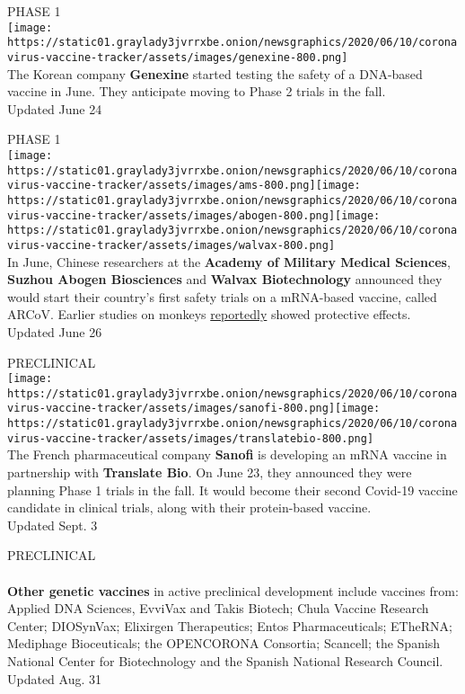 PHASE 1\\
\texttt{[image: https://static01.graylady3jvrrxbe.onion/newsgraphics/2020/06/10/coronavirus-vaccine-tracker/assets/images/genexine-800.png]}\\
The Korean company \textbf{Genexine} started testing the safety of a
DNA-based vaccine in June. They anticipate moving to Phase 2 trials in
the fall.\\
Updated June 24

PHASE 1\\
\texttt{[image: https://static01.graylady3jvrrxbe.onion/newsgraphics/2020/06/10/coronavirus-vaccine-tracker/assets/images/ams-800.png]}\texttt{[image: https://static01.graylady3jvrrxbe.onion/newsgraphics/2020/06/10/coronavirus-vaccine-tracker/assets/images/abogen-800.png]}\texttt{[image: https://static01.graylady3jvrrxbe.onion/newsgraphics/2020/06/10/coronavirus-vaccine-tracker/assets/images/walvax-800.png]}\\
In June, Chinese researchers at the \textbf{Academy of Military Medical
Sciences}, \textbf{Suzhou Abogen Biosciences} and \textbf{Walvax
Biotechnology} announced they would start their country's first safety
trials on a mRNA-based vaccine, called ARCoV. Earlier studies on monkeys
\href{https://news.cgtn.com/news/2020-06-26/China-s-first-COVID-19-mRNA-vaccine-approved-for-clinical-trials-RDTXX0jVJK/index.html}{reportedly}
showed protective effects.\\
Updated June 26

PRECLINICAL\\
\texttt{[image: https://static01.graylady3jvrrxbe.onion/newsgraphics/2020/06/10/coronavirus-vaccine-tracker/assets/images/sanofi-800.png]}\texttt{[image: https://static01.graylady3jvrrxbe.onion/newsgraphics/2020/06/10/coronavirus-vaccine-tracker/assets/images/translatebio-800.png]}\\
The French pharmaceutical company \textbf{Sanofi} is developing an mRNA
vaccine in partnership with \textbf{Translate Bio}. On June 23, they
announced they were planning Phase 1 trials in the fall. It would become
their second Covid-19 vaccine candidate in clinical trials, along with
their protein-based vaccine.\\
Updated Sept. 3

PRECLINICAL\\
~\\
 \textbf{Other genetic vaccines} in active preclinical development
include vaccines from: Applied DNA Sciences, EvviVax and Takis Biotech;
Chula Vaccine Research Center; DIOSynVax; Elixirgen Therapeutics; Entos
Pharmaceuticals; ETheRNA; Mediphage Bioceuticals; the OPENCORONA
Consortia; Scancell; the Spanish National Center for Biotechnology and
the Spanish National Research Council.\\
Updated Aug. 31

